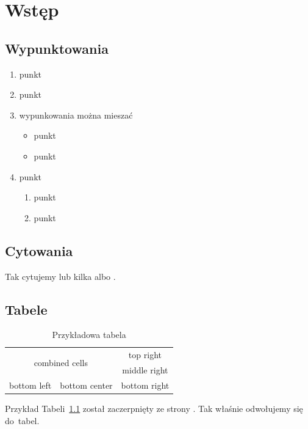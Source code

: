 \chapter[Przykładowy rozdział]{Wstęp} %

\section{Wypunktowania}
\begin{enumerate}
    \item punkt
    \item punkt
    \item wypunkowania można mieszać
\begin{itemize}
    \item punkt
    \item punkt
\end{itemize}
    \item punkt
\begin{enumerate}
    \item punkt
    \item punkt
\end{enumerate}
\end{enumerate}
\section{Cytowania}
Tak cytujemy \cite{NagraTC02} lub kilka \cite{NagraTC02,iso9126} albo \cite[str. 3]{NagraTC02}.
\section{Tabele}
\begin{table}[h]
\centering
\caption{Przykładowa tabela}
\begin{tabular}{|c|c|c|}\hline
\multicolumn{2}{|c|}{\multirow{2}{*}{combined cells}}
     &top right\\ \cline{3-3}
\multicolumn{2}{|c|}{}
     &middle right\\ \hline
bottom left
     &bottom center
     &bottom right\\ \hline
\end{tabular}
\label{tab:prz}
\end{table}
Przykład Tabeli~\ref{tab:prz} został zaczerpnięty ze strony \cite{przyklad}. Tak właśnie odwołujemy się do~tabel.%
